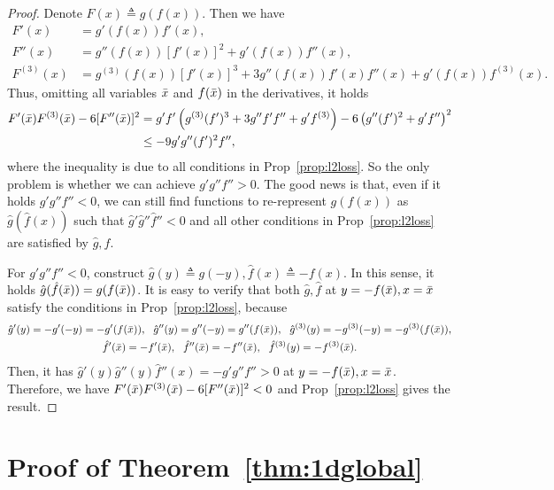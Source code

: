 \documentclass{article}
\theoremstyle{plain}
\theoremstyle{remark}
\begin{document}
\begin{proof}
    Denote $F(x)\triangleq g(f(x))$. Then we have
    \begin{align*}
        F'(x)&=g'(f(x))f'(x), \\
        F''(x)&= g''(f(x))[f'(x)]^2 + g'(f(x))f''(x), \\
        F^{(3)}(x)&= g^{(3)}(f(x))[f'(x)]^3+3g''(f(x))f'(x)f''(x)+g'(f(x))f^{(3)}(x).
    \end{align*}
    Thus, omitting all variables $\Bar{x}$ and $f(\Bar{x})$ in the derivatives, it holds
    \begin{align*}
        F'(\Bar{x})F^{(3)}(\Bar{x}) - 6[F''(\Bar{x})]^2 &= g'f'\left(g^{(3)}(f')^3 + 3g''f'f''+g'f^{(3)}\right)-6\left(g''(f')^2+g'f''\right)^2 \\
        &\le -9 g'g''(f')^2 f'',
    \end{align*}
    where the inequality is due to all conditions in Prop~\ref{prop:l2loss}. So the only problem is whether we can achieve $g'g'' f''>0$. The good news is that, even if it holds $g'g''f''<0$, we can still find functions to re-represent $g(f(x))$ as $\hat{g}(\hat{f}(x))$ such that $\hat{g}'\hat{g}''\hat{f}''<0$ and all other conditions in Prop~\ref{prop:l2loss} are satisfied by $\hat{g},\hat{f}$.

    For $g'g''f''<0$, construct $\hat{g}(y)\triangleq g(-y), \hat{f}(x)\triangleq -f(x)$. In this sense, it holds $\hat{g}(\hat{f}(\Bar{x}))=g(f(\Bar{x}))$. It is easy to verify that both $\hat{g}, \hat{f}$ at $y=-f(\Bar{x}),x=\Bar{x}$ satisfy the conditions in Prop~\ref{prop:l2loss}, because 
    \begin{gather*}
        \hat{g}'(y)=-g'(-y)=-g'(f(\Bar{x})), ~~ \hat{g}''(y)=g''(-y)=g''(f(\Bar{x})),~~ \hat{g}^{(3)}(y)=-g^{(3)}(-y)=-g^{(3)}(f(\Bar{x})),\\
        \hat{f}'(\Bar{x})=-f'(\Bar{x}),~~ \hat{f}''(\Bar{x})=-f''(\Bar{x}),~~ \hat{f}^{(3)}(y)=-f^{(3)}(\Bar{x}).
    \end{gather*}
    Then, it has $\hat{g}'(y)\hat{g}''(y)\hat{f}''(x)=-g'g''f''>0$ at $y=-f(\Bar{x}),x=\Bar{x}$. Therefore, we have $F'(\Bar{x})F^{(3)}(\Bar{x}) - 6[F''(\Bar{x})]^2<0$ and Prop~\ref{prop:l2loss} gives the result.
    \end{proof}



\section{Proof of Theorem~\ref{thm:1dglobal}}
\label{app:1dglobal}
\end{document}
